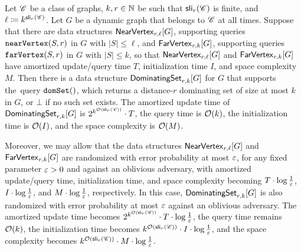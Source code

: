 \begin{lemma}\label{lem:summary-dom}
	Let $\Cc$ be a class of graphs, $k,r\in \N$ be such that $\sli_r(\Cc)$ is finite, and $\ell\coloneqq k^{\sli_r(\Cc)}$. Let $G$ be a dynamic graph that belongs to $\Cc$ at all times. Suppose that there are data structures $\nearVertexDS{G}{r,\ell}$, supporting queries $\near{S,r}$ in $G$ with $|S|\leq \ell$, and $\farVertexDS{G}{r,k}$, supporting queries $\far{S,r}$ in $G$ with $|S|\leq k$, so that $\nearVertexDS{G}{r,\ell}$ and $\farVertexDS{G}{r,k}$ have amortized update/query time $T$, initialization time $I$, and space complexity $M$. Then there is a data structure $\dominatingSetDS{G}{r,k}$ for $G$ that supports the~query
	$\ds{}$, which returns a distance-$r$ dominating set of size at most $k$ in $G$, or $\bot$ if no such set exists.
	The amortized update time of $\dominatingSetDS{G}{r,k}$ is $2^{k^{\Oh(\sli_r(\Cc))}}\cdot T$, the query time is $\Oh(k)$, the initialization time is $\Oh(I)$, and the space complexity is $\Oh(M)$.
	
	Moreover, we may allow that the data structures $\nearVertexDS{G}{r,\ell}$ and $\farVertexDS{G}{r,k}$ are randomized with error probability at most $\eps$, for any fixed parameter $\eps>0$ and against an oblivious adversary, with amortized update/query time, initialization time, and space complexity becoming $T\cdot \log \tfrac{1}{\eps}$, $I\cdot \log \tfrac{1}{\eps}$, and $M\cdot \log \tfrac{1}{\eps}$, respectively. In this case,  $\dominatingSetDS{G}{r,k}$ is also randomized with error probability at most $\eps$ against an oblivious adversary. The amortized update time becomes $2^{k^{\Oh(\sli_r(\Cc))}}\cdot T\cdot \log \tfrac{1}{\eps}$, the query time remains $\Oh(k)$, the initialization time becomes $k^{\Oh(\sli_r(\Cc))}\cdot I\cdot \log \tfrac{1}{\eps}$, and the space complexity becomes  $k^{\Oh(\sli_r(\Cc))}\cdot M\cdot \log \tfrac{1}{\eps}$.
\end{lemma}
